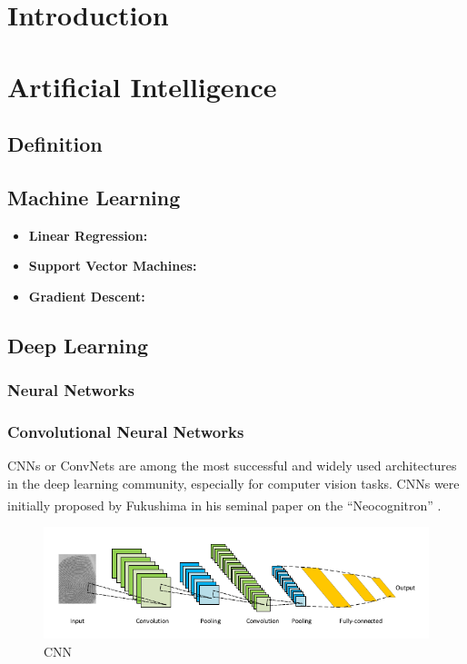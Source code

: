 \section{Introduction}
\vspace{0.2in}
\hspace*{0.16in}

\section{Artificial Intelligence}
\subsection{Definition}

\subsection{Machine Learning}

\begin{itemize}
  \item \textbf{Linear Regression:}
  \item \textbf{Support Vector Machines:}
  \item \textbf{Gradient Descent:}
\end{itemize}

\subsection{Deep Learning}
\subsubsection{Neural Networks}
\subsubsection{Convolutional Neural Networks}
CNNs or ConvNets are among the most successful and widely used architectures in the deep learning community, especially for computer vision tasks. CNNs were initially proposed by Fukushima in his seminal paper on the “Neocognitron” \textsuperscript{\cite{fukushima_Neocognitron}}.

\begin{figure}[H]
\centering
\includegraphics[width=\linewidth]{../images/CNN.png}
\caption{CNN}
\label{fig:CNN}
\end{figure}

